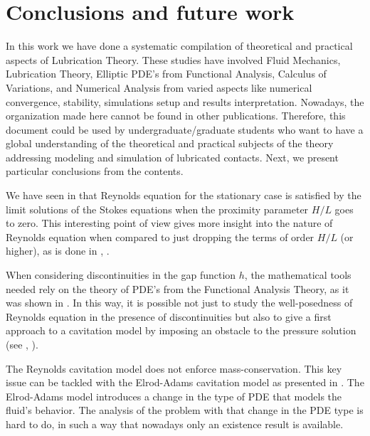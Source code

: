 \chapter{Conclusions and future work}
\label{chap:conclusions_future_work}
In this work we have done a systematic compilation of theoretical and practical aspects of Lubrication Theory. These studies have involved Fluid Mechanics, Lubrication Theory, Elliptic PDE's from Functional Analysis, Calculus of Variations, and Numerical Analysis from varied aspects like numerical convergence, stability, simulations setup and results interpretation. Nowadays, the organization made here cannot be found in other publications. Therefore, this document could be used by undergraduate/graduate students who want to have a global understanding of the theoretical and practical subjects of the theory addressing modeling and simulation of lubricated contacts. Next, we present particular conclusions from the contents.

We have seen in  that Reynolds equation for the stationary case is satisfied by the limit solutions of the Stokes equations when the proximity parameter $H/L$ goes to zero. This interesting point of view gives more insight into the nature of Reynolds equation when compared to just dropping the terms of order $H/L$ (or higher), as is done in , .

When considering discontinuities in the gap function $h$, the mathematical tools needed rely on the theory of PDE's from the Functional Analysis Theory, as it was shown in . In this way, it is possible not just to study the well-posedness of Reynolds equation in the presence of discontinuities but also to give a first approach to a cavitation model by imposing an obstacle to the pressure solution (see , ).

The Reynolds cavitation model does not enforce mass-conservation. This key issue can be tackled with the Elrod-Adams cavitation model as presented in . The Elrod-Adams model introduces a change in the type of PDE that models the fluid's behavior. The analysis of the problem with that change in the PDE type is hard to do, in such a way that nowadays only an existence result is available.

